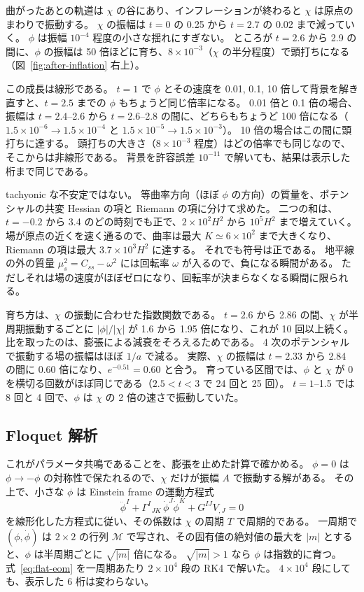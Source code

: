 \documentclass[a4paper,11pt]{ltjsarticle}
\begin{document}
曲がったあとの軌道は $\chi$ の谷にあり、インフレーションが終わると $\chi$ は原点のまわりで振動する。
$\chi$ の振幅は $t=0$ の 0.25 から $t=2.7$ の 0.02 まで減っていく。
$\phi$ は振幅 $10^{-4}$ 程度の小さな揺れにすぎない。
ところが $t=2.6$ から 2.9 の間に、$\phi$ の振幅は 50 倍ほどに育ち、$8\times10^{-3}$（$\chi$ の半分程度）で頭打ちになる（図~\ref{fig:after-inflation} 右上）。

この成長は線形である。
$t=1$ で $\phi$ とその速度を 0.01, 0.1, 10 倍して背景を解き直すと、$t=2.5$ までの $\phi$ もちょうど同じ倍率になる。
0.01 倍と 0.1 倍の場合、振幅は $t=2.4$--2.6 から $t=2.6$--2.8 の間に、どちらもちょうど 100 倍になる（$1.5\times10^{-6}\to1.5\times10^{-4}$ と $1.5\times10^{-5}\to1.5\times10^{-3}$）。
10 倍の場合はこの間に頭打ちに達する。
頭打ちの大きさ（$8\times10^{-3}$ 程度）はどの倍率でも同じなので、そこからは非線形である。
背景を許容誤差 $10^{-11}$ で解いても、結果は表示した桁まで同じである。

tachyonic な不安定ではない。
等曲率方向（ほぼ $\phi$ の方向）の質量を、ポテンシャルの共変 Hessian の項と Riemann の項に分けて求めた。
二つの和は、$t=-0.2$ から 3.4 のどの時刻でも正で、$2\times10^2H^2$ から $10^5H^2$ まで増えていく。
場が原点の近くを速く通るので、曲率は最大 $K\simeq6\times10^2$ まで大きくなり、Riemann の項は最大 $3.7\times10^3H^2$ に達する。
それでも符号は正である。
地平線の外の質量 $\mu_s^2=C_{ss}-\omega^2$ には回転率 $\omega$ が入るので、負になる瞬間がある。
ただしそれは場の速度がほぼゼロになり、回転率が決まらなくなる瞬間に限られる。

育ち方は、$\chi$ の振動に合わせた指数関数である。
$t=2.6$ から 2.86 の間、$\chi$ が半周期振動するごとに $|\phi|/|\chi|$ が 1.6 から 1.95 倍になり、これが 10 回以上続く。
比を取ったのは、膨張による減衰をそろえるためである。
4 次のポテンシャルで振動する場の振幅はほぼ $1/a$ で減る。
実際、$\chi$ の振幅は $t=2.33$ から 2.84 の間に 0.60 倍になり、$e^{-0.51}=0.60$ と合う。
育っている区間では、$\phi$ と $\chi$ が 0 を横切る回数がほぼ同じである（$2.5<t<3$ で 24 回と 25 回）。
$t=1$--1.5 では 8 回と 4 回で、$\phi$ は $\chi$ の 2 倍の速さで振動していた。

\subsection{Floquet 解析}

これがパラメータ共鳴であることを、膨張を止めた計算で確かめる。
$\phi=0$ は $\phi\to-\phi$ の対称性で保たれるので、$\chi$ だけが振幅 $A$ で振動する解がある。
その上で、小さな $\phi$ は Einstein frame の運動方程式
\begin{equation}
\ddot\phi^I+\Gamma^I{}_{JK}\,\dot\phi^J\dot\phi^K+G^{IJ}V_{,J}=0
\label{eq:flat-eom}
\end{equation}
を線形化した方程式に従い、その係数は $\chi$ の周期 $T$ で周期的である。
一周期で $(\phi,\dot\phi)$ は $2\times2$ の行列 $\mathcal M$ で写され、その固有値の絶対値の最大を $|m|$ とすると、$\phi$ は半周期ごとに $\sqrt{|m|}$ 倍になる。
$\sqrt{|m|}>1$ なら $\phi$ は指数的に育つ。
式~\eqref{eq:flat-eom} を一周期あたり $2\times10^4$ 段の RK4 で解いた。
$4\times10^4$ 段にしても、表示した 6 桁は変わらない。
\end{document}
